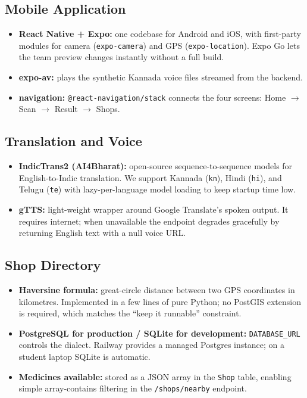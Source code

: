 \documentclass[11pt]{article}
\begin{document}
\subsection{Mobile Application}
\begin{itemize}
    \item \textbf{React Native + Expo:} one codebase for Android and iOS, with first-party modules for camera (\texttt{expo-camera}) and GPS (\texttt{expo-location}). Expo Go lets the team preview changes instantly without a full build.
    \item \textbf{expo-av:} plays the synthetic Kannada voice files streamed from the backend.
    \item \textbf{navigation:} \texttt{@react-navigation/stack} connects the four screens: Home $\to$ Scan $\to$ Result $\to$ Shops.
\end{itemize}

\subsection{Translation and Voice}
\begin{itemize}
    \item \textbf{IndicTrans2 (AI4Bharat):} open-source sequence-to-sequence models for English-to-Indic translation. We support Kannada (\texttt{kn}), Hindi (\texttt{hi}), and Telugu (\texttt{te}) with lazy-per-language model loading to keep startup time low.
    \item \textbf{gTTS:} light-weight wrapper around Google Translate's spoken output. It requires internet; when unavailable the endpoint degrades gracefully by returning English text with a null voice URL.
\end{itemize}

\subsection{Shop Directory}
\begin{itemize}
    \item \textbf{Haversine formula:} great-circle distance between two GPS coordinates in kilometres. Implemented in a few lines of pure Python; no PostGIS extension is required, which matches the ``keep it runnable'' constraint.
    \item \textbf{PostgreSQL for production / SQLite for development:} \texttt{DATABASE\_URL} controls the dialect. Railway provides a managed Postgres instance; on a student laptop SQLite is automatic.
    \item \textbf{Medicines available:} stored as a JSON array in the \texttt{Shop} table, enabling simple array-contains filtering in the \texttt{/shops/nearby} endpoint.
\end{itemize}
\end{document}
